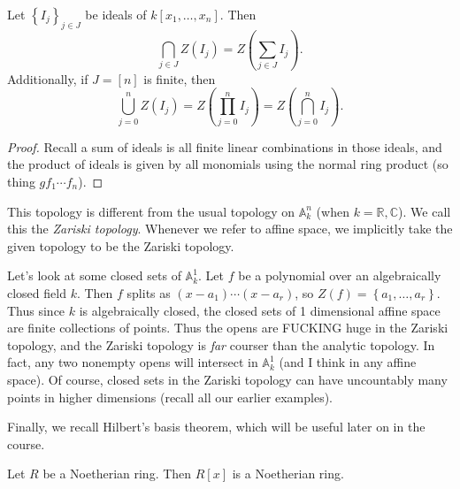 \begin{lemma}\label{lma:1.1.4}
	Let $\left\{ I_j \right\} _{j\in J} $ be ideals of $k[x_1, \ldots ,x_n]$. Then
	\[
		\bigcap_{j\in J} Z(I_j) = Z\left( \sum_{j\in J} I_j \right) 
	.\]
	Additionally, if $J=[n]$ is finite, then
	\[
		\bigcup_{j=0}^n Z(I_j) = Z\left( \prod_{j=0}^n I_j \right) = Z\left( \bigcap_{j=0}^n I_j \right) 
	.\]
\end{lemma}
\begin{proof}
	Recall a sum of ideals is all finite linear combinations in those ideals, and the product of ideals is given by all monomials using the normal ring product (so thing $gf_1\cdots f_n$).
\end{proof}

This topology is different from the usual topology on $\mathbb{A} _k^n$ (when $k=\mathbb{R} ,\mathbb{C} $). We call this the \emph{Zariski topology}. Whenever we refer to affine space, we implicitly take the given topology to be the Zariski topology.

Let's look at some closed sets of $\mathbb{A} _k^1$. Let $f$ be a polynomial over an algebraically closed field $k$. Then $f$ splits as $(x-a_1)\cdots (x-a_r)$, so $Z(f)=\left\{ a_1, \ldots ,a_r \right\} $. Thus since $k$ is algebraically closed, the closed sets of 1 dimensional affine space are finite collections of points. Thus the opens are FUCKING huge in the Zariski topology, and the Zariski topology is \emph{far} courser than the analytic topology. In fact, any two nonempty opens will intersect in $\mathbb{A} _k^1$ (and I think in any affine space). Of course, closed sets in the Zariski topology can have uncountably many points in higher dimensions (recall all our earlier examples).

Finally, we recall Hilbert's basis theorem, which will be useful later on in the course.

\begin{theorem}\label{thm:hilbertbasis}
	Let $R$ be a Noetherian ring. Then $R[x]$ is a Noetherian ring.
\end{theorem}


